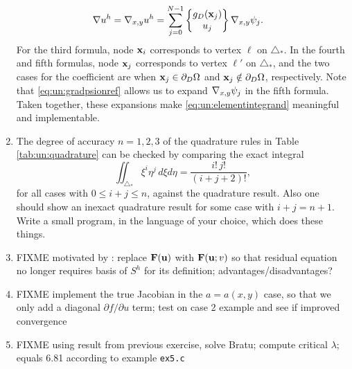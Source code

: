 \begin{enumerate}
\begin{align*}
\nabla u^h &= \nabla_{x,y} u^h = \sum_{j=0}^{N-1} \left\{\begin{matrix} g_D(\mathbf{x}_j) \\ u_j \end{matrix}\right\} \nabla_{x,y} \psi_j.
\end{align*}
For the third formula, node $\mathbf{x}_i$ corresponds to vertex $\ell$ on $\triangle_\ast$.  In the fourth and fifth formulas, node $\mathbf{x}_j$ corresponds to vertex $\ell'$ on $\triangle_\ast$, and the two cases for the coefficient are when $\mathbf{x}_j \in \partial_D \Omega$ and $\mathbf{x}_j \notin \partial_D \Omega$, respectively.  Note that \eqref{eq:un:gradpsionref} allows us to expand $\nabla_{x,y} \psi_j$ in the fifth formula.  Taken together, these expansions make \eqref{eq:un:elementintegrand} meaningful and implementable.
\item  \label{exer:un:checkquadrature}  The degree of accuracy $n=1,2,3$ of the quadrature rules in Table \ref{tab:un:quadrature} can be checked by comparing the exact integral
\begin{equation}
\iint_{\triangle_\ast} \xi^i \eta^j\,d\xi d\eta = \frac{i!\,j!}{(i+j+2)!}, \label{eq:un:checkquadrature}
\end{equation}
for all cases with $0\le i+j\le n$, against the quadrature result.  Also one should show an inexact quadrature result for some case with $i+j=n+1$.  Write a small program, in the language of your choice, which does these things.
\item \label{exer:un:basisfreeresidual} FIXME motivated by \citep{Loggetal2012}: replace $\mathbf{F}(\mathbf{u})$ with $\mathbf{F}(\mathbf{u};v)$ so that residual equation no longer requires basis of $S^h$ for its definition; advantages/disadvantages?
\item \label{exer:un:truejacobian} FIXME implement the true Jacobian in the $a=a(x,y)$ case, so that we only add a diagonal $\partial f/\partial u$ term; test on case 2 example and see if improved \pSNES convergence
\item \label{exer:un:bratu} FIXME using result from previous exercise, solve Bratu; compute critical $\lambda$; equals 6.81 according to \pSNES example \texttt{ex5.c}
\end{enumerate}

